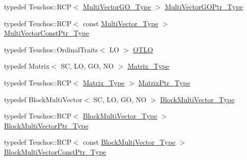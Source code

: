 \begin{DoxyCompactItemize}
\item 
typedef Teuchos\+::\+R\+CP$<$ \hyperlink{classFEDD_1_1ErrorEstimation_a450a5b3954044f55167783097b934bbd}{Multi\+Vector\+G\+O\+\_\+\+Type} $>$ \hyperlink{classFEDD_1_1ErrorEstimation_ae8bf11f0cc5d77bca487f6e2541a57b8}{Multi\+Vector\+G\+O\+Ptr\+\_\+\+Type}
\item 
typedef Teuchos\+::\+R\+CP$<$ const \hyperlink{classFEDD_1_1ErrorEstimation_a1c6fa9610a1e5e887e5a88ab33f1c792}{Multi\+Vector\+\_\+\+Type} $>$ \hyperlink{classFEDD_1_1ErrorEstimation_a577235ef4fd7efda312b8e2482617988}{Multi\+Vector\+Const\+Ptr\+\_\+\+Type}
\item 
typedef Teuchos\+::\+Ordinal\+Traits$<$ LO $>$ \hyperlink{classFEDD_1_1ErrorEstimation_a1b356a52ad66b086de32457a51104038}{O\+T\+LO}
\item 
typedef Matrix$<$ SC, LO, GO, NO $>$ \hyperlink{classFEDD_1_1ErrorEstimation_a4c4fef6ebb4e98048a10b84069371e80}{Matrix\+\_\+\+Type}
\item 
typedef Teuchos\+::\+R\+CP$<$ \hyperlink{classFEDD_1_1ErrorEstimation_a4c4fef6ebb4e98048a10b84069371e80}{Matrix\+\_\+\+Type} $>$ \hyperlink{classFEDD_1_1ErrorEstimation_a087074cb92827fb21dac83cb1644c244}{Matrix\+Ptr\+\_\+\+Type}
\item 
typedef Block\+Multi\+Vector$<$ SC, LO, GO, NO $>$ \hyperlink{classFEDD_1_1ErrorEstimation_a91845e337e3d46305cd20c0c9cb08cdc}{Block\+Multi\+Vector\+\_\+\+Type}
\item 
typedef Teuchos\+::\+R\+CP$<$ \hyperlink{classFEDD_1_1ErrorEstimation_a91845e337e3d46305cd20c0c9cb08cdc}{Block\+Multi\+Vector\+\_\+\+Type} $>$ \hyperlink{classFEDD_1_1ErrorEstimation_ae9a6299169da55a65a3c3a10a16b455e}{Block\+Multi\+Vector\+Ptr\+\_\+\+Type}
\item 
typedef Teuchos\+::\+R\+CP$<$ const \hyperlink{classFEDD_1_1ErrorEstimation_a91845e337e3d46305cd20c0c9cb08cdc}{Block\+Multi\+Vector\+\_\+\+Type} $>$ \hyperlink{classFEDD_1_1ErrorEstimation_a8a53d809dfcf71abaffe46f85e6b4aa1}{Block\+Multi\+Vector\+Const\+Ptr\+\_\+\+Type}
\end{DoxyCompactItemize}
